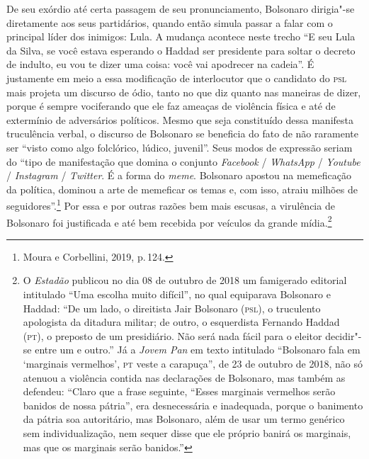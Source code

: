 De seu exórdio até certa passagem de seu pronunciamento, Bolsonaro
dirigia"-se diretamente aos seus partidários, quando então simula passar
a falar com o principal líder dos inimigos: Lula. A mudança acontece
neste trecho ``E seu Lula da Silva, se você estava esperando o Haddad
ser presidente para soltar o decreto de indulto, eu vou te dizer uma
coisa: você vai apodrecer na cadeia''. É justamente em meio a essa
modificação de interlocutor que o candidato do \textsc{psl} mais projeta um
discurso de ódio, tanto no que diz quanto nas maneiras de dizer, porque
é sempre vociferando que ele faz ameaças de violência física e até de
extermínio de adversários políticos. Mesmo que seja constituído dessa
manifesta truculência verbal, o discurso de Bolsonaro se beneficia do
fato de não raramente ser ``visto como algo folclórico, lúdico,
juvenil''. Seus modos de expressão seriam do ``tipo de manifestação que
domina o conjunto \emph{Facebook} / \emph{WhatsApp} / \emph{Youtube} /
\emph{Instagram} / \emph{Twitter}. É a forma do \emph{meme}. Bolsonaro
apostou na memeficação da política, dominou a arte de memeficar os temas
e, com isso, atraiu milhões de seguidores''.\footnote{Moura e Corbellini,
  2019, p.\,124.} Por essa e por outras razões bem mais escusas, a
virulência de Bolsonaro foi justificada e até bem recebida por veículos
da grande mídia.\footnote{O \emph{Estadão} publicou no dia 08 de outubro
  de 2018 um famigerado editorial intitulado ``Uma escolha muito
  difícil'', no qual equiparava Bolsonaro e Haddad: ``De um lado, o
  direitista Jair Bolsonaro (\textsc{psl}), o truculento apologista da ditadura
  militar; de outro, o esquerdista Fernando Haddad (\textsc{pt}), o preposto de
  um presidiário. Não será nada fácil para o eleitor decidir"-se entre um
  e outro.'' Já a \emph{Jovem Pan} em texto intitulado ``Bolsonaro fala em
  `marginais vermelhos', \textsc{pt} veste a carapuça'', de 23 de outubro de 2018, não só atenuou a violência contida nas declarações de Bolsonaro, mas também as
  defendeu: ``Claro que a frase seguinte, ``Esses marginais vermelhos
  serão banidos de nossa pátria'', era desnecessária e inadequada,
  porque o banimento da pátria soa autoritário, mas Bolsonaro, além de
  usar um termo genérico sem individualização, nem sequer disse que ele
  próprio banirá os marginais, mas que os marginais serão banidos.''}

